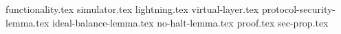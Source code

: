 \documentclass{llncs}
\begin{document}
\pagestyle{plain}
{functionality.tex}
{simulator.tex}
{lightning.tex}
{virtual-layer.tex}
{protocol-security-lemma.tex}
{ideal-balance-lemma.tex}
{no-halt-lemma.tex}
{proof.tex}
{sec-prop.tex}


\end{document}
